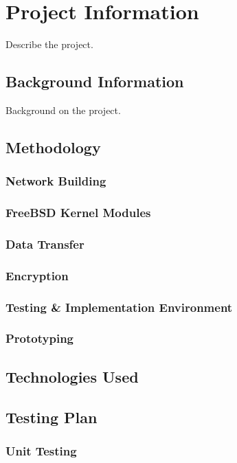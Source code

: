 \chapter{Project Information}
\label{chp:Project Information}
Describe the project.

\section{Background Information}
Background on the project.

\section{Methodology}
\subsection{Network Building}
\subsection{FreeBSD Kernel Modules}
\subsection{Data Transfer}
\subsection{Encryption}
\subsection{Testing \& Implementation Environment}
\subsection{Prototyping}

\section{Technologies Used}

\section{Testing Plan}
\subsection{Unit Testing}
